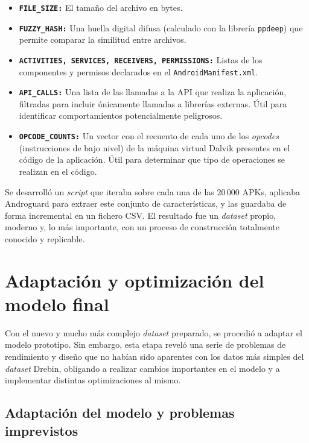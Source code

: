 \begin{itemize}
	\item \textbf{\texttt{FILE\_SIZE:}} El tamaño del archivo en bytes.
	
	\item \textbf{\texttt{FUZZY\_HASH:}} Una huella digital difusa (calculado con la librería \texttt{ppdeep}) que permite comparar la similitud entre archivos.
	
	\item \textbf{\texttt{ACTIVITIES, SERVICES, RECEIVERS, PERMISSIONS:}} Listas de los componentes y permisos declarados en el \texttt{AndroidManifest.xml}.
	
	\item \textbf{\texttt{API\_CALLS:}} Una lista de las llamadas a la API que realiza la aplicación, filtradas para incluir únicamente llamadas a librerías externas. Útil para identificar comportamientos potencialmente peligrosos.
	
	\item \textbf{\texttt{OPCODE\_COUNTS:}} Un vector con el recuento de cada uno de los \textit{opcodes} (instrucciones de bajo nivel) de la máquina virtual Dalvik presentes en el código de la aplicación. Útil para determinar que tipo de operaciones se realizan en el código.
\end{itemize}

Se desarrolló un \textit{script} que iteraba sobre cada una de las 20\,000 APKs, aplicaba Androguard para extraer este conjunto de características, y las guardaba de forma incremental en un fichero CSV. El resultado fue un \textit{dataset} propio, moderno y, lo más importante, con un proceso de construcción totalmente conocido y replicable.

\section{Adaptación y optimización del modelo final}

Con el nuevo y mucho más complejo \textit{dataset} preparado, se procedió a adaptar el modelo prototipo. Sin embargo, esta etapa reveló una serie de problemas de rendimiento y diseño que no habían sido aparentes con los datos más simples del \textit{dataset} Drebin, obligando a realizar cambios importantes en el modelo y a implementar distintas optimizaciones al mismo.

\subsection{Adaptación del modelo y problemas imprevistos}

